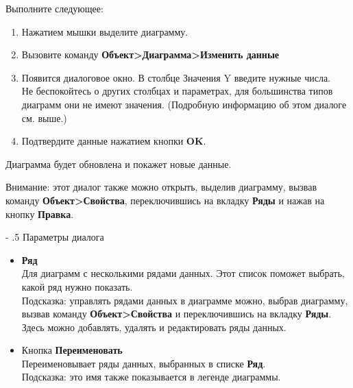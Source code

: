 \documentclass[a4paper,10pt]{article}
\makeatletter
\renewcommand\paragraph{%
   \@startsection{paragraph}{4}{0mm}%
      {-\baselineskip}%
      {.5\baselineskip}%
      {\normalfont\normalsize\bfseries}}
\makeatother
\begin{document}
Выполните следующее:
\begin{enumerate}
 \item Нажатием мышки выделите диаграмму.
 \item Вызовите команду \textbf{Объект>Диаграмма>Изменить данные}
 \item Появится диалоговое окно. В столбце Значения Y введите нужные числа.\\
Не беспокойтесь о других столбцах и параметрах, для большинства типов диаграмм они не имеют значения. (Подробную информацию об этом диалоге см. выше.)
\item Подтвердите данные нажатием кнопки \textbf{OK}.
\end{enumerate}

Диаграмма будет обновлена и покажет новые данные.

Внимание: этот диалог также можно открыть, выделив диаграмму, вызвав команду \textbf{Объект>Свойства}, переключившись на вкладку \textbf{Ряды} и нажав на кнопку \textbf{Правка}.

\paragraph{Параметры диалога}
\begin{itemize}
 \item \textbf{Ряд}\\
 Для диаграмм с несколькими рядами данных. Этот список поможет выбрать, какой ряд нужно показать. \\
 Подсказка: управлять рядами данных в диаграмме можно, выбрав диаграмму, вызвав команду \textbf{Объект>Свойства} и переключившись на вкладку \textbf{Ряды}. Здесь можно добавлять, удалять и редактировать ряды данных.
 \item Кнопка \textbf{Переименовать}\\
 Переименовывает ряды данных, выбранных в списке \textbf{Ряд}.\\
 Подсказка: это имя также показывается в легенде диаграммы.
\end{itemize}
\end{document}
